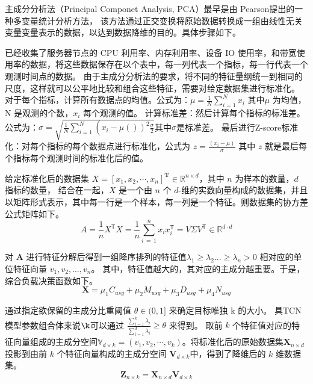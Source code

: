主成分分析法（Principal Componet Analysis, PCA）最早是由 Pearson\cite{kpfrs1901lines}提出的一种多变量统计分析方法，
该方法通过正交变换将原始数据转换成一组由线性无关变量变量表示的数据，以达到数据降维的目的\cite{李可佳2023基于主成分分析和函数机制的差分隐私线性回归算法}。具体步骤如下。

已经收集了服务器节点的 CPU 利用率、内存利用率、设备 IO 使用率，和带宽使用率的数据，将这些数据保存在以个表中，每一列代表一个指标，每一行代表一个观测时间点的数据。
由于主成分分析法的要求，将不同的特征量纲统一到相同的尺度，这样就可以公平地比较和组合这些特征，需要对给定数据集进行标准化。
对于每个指标，计算所有数据点的均值。公式为：$\mu=\frac{1}{N}\sum_{i=1}^{N}x_{i}$ 其中$\mu$ 为均值，N 是观测的个数，$x_{i}$ 每个观测的值。
计算标准差：然后计算每个指标的标准差。公式为：$\sigma = \sqrt{\frac{1}{N} \sum_{i = 1}^{N} \left(\right. x_{i} - \mu \left(\left.\right)\right)^{2}\frac{\sigma}{2}}$其中$\sigma$是标准差。
最后进行Z-score标准化：对每个指标的每个数据点进行标准化，公式为 $z = \frac{(x_{i} - \mu)}{\sigma}$ 其中 $z$ 就是最后每个指标每个观测时间的标准化后的值。

给定标准化后的数据集 $X = [x_1, x_2, \cdots, x_n]^{\mathbf{T}} \in \mathbb{R}^{n \times d}$，其中 $n$ 为样本的数量，$d$ 指标的数量，
结合在一起，\( X \) 是一个由 \( n \) 个 \( d \)-维的实数向量构成的数据集，并且以矩阵形式表示，其中每一行是一个样本，每一列是一个特征。则数据集的协方差公式矩阵如下。
\begin{equation}
	A={\frac{1}{n}}X^{\mathsf{T}}X={\frac{1}{n}}\sum_{i\,=\,1}^{n}x_{i}x_{i}^{\mathsf{T}}=V\Sigma V^{\mathsf{T}}\in\mathbb{R}^{d\cdot d}
\end{equation}

对 $\mathbf{A}$ 进行特征分解后得到一组降序排列的特征值$\lambda_1 \ge \lambda_2 ... \ge \lambda_n > 0$ 相对应的单位特征向量 $v_1, v_2, \dots, v_n$。
其中，特征值越大的，其对应的主成分越重要。于是，综合负载决策函数如下。
\begin{equation}
	\mathbf{X} = \mu_1C_{usg} + \mu_2M_{usg} + \mu_3D_{usg} + \mu_4N_{usg}
\end{equation}

通过指定欲保留的主成分比重阈值 $\theta \in (0, 1]$ 来确定目标唯独 k 的大小。
具TCN 模型参数组合体来说$\k$可以通过 $\frac{\sum^{k}_{i = 1}\lambda_i}{\sum^{d}_{i = 1}\lambda_i} \ge \theta$ 来得到。
取前 $k$ 个特征值对应的特征向量组成的主成分空间$\mathbb{V}_{d \times k} = (v_1, v_2, \cdots, v_k)$。将标准化后的原始数据集$\mathbf{X}_{n \times d}$ 投影到由前 $k$ 个特征向量构成的主成分空间 $\mathbf{V}_{d \times k}$中，得到了降维后的 $k$ 维数据集。
\begin{equation}
	\mathbf{Z}_{n \times k} = \mathbf{X}_{n \times d}\mathbf{V}_{d \times k}
\end{equation}

